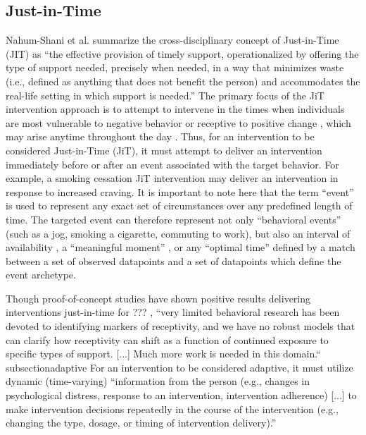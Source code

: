 \documentclass[runningheads,a4paper]{llncs}
\begin{document}
\subsection{Just-in-Time}
Nahum-Shani et al. summarize the cross-disciplinary concept of Just-in-Time (JIT) as “the effective provision of timely support, operationalized by offering the type of support needed, precisely when needed, in a way that minimizes waste (i.e., defined as anything that does not benefit the person) and accommodates the real-life setting in which support is needed.”
The primary focus of the JiT intervention approach is to attempt to intervene in the times when individuals are most vulnerable to negative behavior or receptive to positive change \cite{Ben-Zeev et al., 2014; King et al. 2013}, which may arise anytime throughout the day \cite{Fletcher, Tobias, and Wisher, 2007; Witkiewitz and Marlatt, 2004}.
Thus, for an intervention to be considered Just-in-Time (JiT), it must attempt to deliver an intervention immediately before or after an event associated with the target behavior. 
For example, a smoking cessation JiT intervention may deliver an intervention in response to increased craving.
It is important to note here that the term “event” is used to represent any exact set of circumstances over any predefined length of time.
The targeted event can therefore represent not only “behavioral events” (such as a jog, smoking a cigarette, commuting to work), but also an interval of availability \cite{???}, a “meaningful moment” \cite{???}, or any “optimal time” \cite{???} defined by a match between a set of observed datapoints and a set of datapoints which define the event archetype.

Though proof-of-concept studies have shown positive results delivering interventions just-in-time for ??? \cite{???}, “very limited behavioral research has been devoted to identifying markers of receptivity, and we have no robust models that can clarify how receptivity can shift as a function of continued exposure to specific types of support. [...] Much more work is needed in this domain.“ \cite{nahum2014}
subsection{adaptive}
For an intervention to be considered adaptive, it must utilize dynamic (time-varying) “information from the person (e.g., changes in psychological distress, response to an intervention, intervention adherence) [...] to make intervention decisions repeatedly in the course of the intervention (e.g., changing the type, dosage, or timing of intervention delivery).” \cite{nahum2014}
\end{document}
